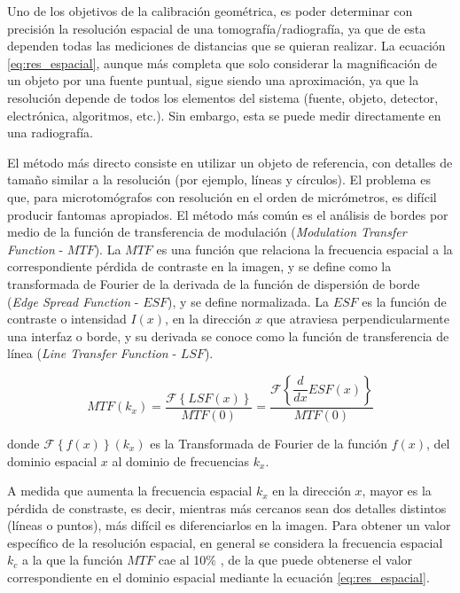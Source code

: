 Uno de los objetivos de la calibración geométrica, es poder determinar con precisión
la resolución espacial de una tomografía/radiografía, ya que de esta dependen todas las
mediciones de distancias que se quieran realizar. La ecuación \ref{eq:res_espacial},
aunque más completa que solo considerar la magnificación de un objeto por una fuente
puntual, sigue siendo una aproximación, ya que la resolución depende de todos los elementos
del sistema (fuente, objeto, detector, electrónica, algoritmos, etc.). Sin embargo,
esta se puede medir directamente en una radiografía.

El método más directo consiste en utilizar un objeto de referencia, con detalles de
tamaño similar a la resolución (por ejemplo, líneas y círculos). El problema es que,
para microtomógrafos con resolución en el orden de micrómetros, es difícil producir
fantomas apropiados. El método más común es el análisis de bordes por medio de la
función de transferencia de modulación (\textit{Modulation Transfer Function} - $MTF$)\cite{Buzug2008}.
La $MTF$ es una función que relaciona la frecuencia espacial a la correspondiente
pérdida de contraste en la imagen, y se define como la transformada de Fourier de la
derivada de la función de dispersión de borde (\textit{Edge Spread Function} - $ESF$), y se define normalizada. La $ESF$ es la función de
contraste o intensidad $I(x)$, en la dirección $x$ que atraviesa perpendicularmente una interfaz o borde,
y su derivada se conoce como la función de transferencia de línea (\textit{Line Transfer
Function} - $LSF$). \cite{Samei1998}\cite{Rueckel2014}

\begin{equation}
    MTF(k_x) = \dfrac{\mathcal{F}\left\{LSF(x)\right\}}{MTF(0)} =
    \dfrac{\mathcal{F}\left\{\dfrac{d}{dx}ESF(x)\right\}}{MTF(0)}
    \label{eq:MTF}
\end{equation}

\noindent donde $\mathcal{F}\left\{f(x)\right\}(k_x)$ es la Transformada de Fourier de la
función $f(x)$, del dominio espacial $x$ al dominio de frecuencias $k_x$.

A medida que aumenta la frecuencia espacial $k_x$ en la dirección $x$, mayor es la pérdida
de constraste, es decir, mientras más cercanos sean dos detalles distintos (líneas o puntos),
más difícil es diferenciarlos en la imagen. Para obtener un valor específico de la
resolución espacial, en general se considera la frecuencia espacial $k_c$ a la que la
función $MTF$ cae al 10$\%$ \cite{Ruf2020}, de la que puede obtenerse el valor correspondiente en el
dominio espacial mediante la ecuación \ref{eq:res_espacial}.

